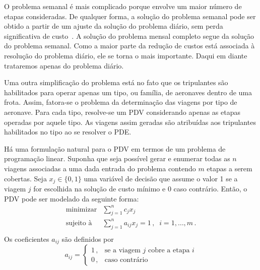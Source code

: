 \documentclass[12pt,a4paper]{article}
\newcommand{\ev}{\, ,}                                       %
\newcommand{\ep}{\, .}                                       %
\begin{document}
O problema semanal é mais complicado porque envolve um maior número de etapas consideradas. De
qualquer forma, a solução do problema semanal pode ser obtido a partir de um ajuste da solução do
problema diário, sem perda significativa de custo~\cite{gopalakrishnan05}. A solução do problema
mensal completo segue da solução do problema semanal. Como a maior parte da redução de custos está
associada à resolução do problema diário, ele se torna o mais importante. Daqui em diante trataremos
apenas do problema diário.

Uma outra simplificação do problema está no fato que os tripulantes são habilitados para operar
apenas um tipo, ou família, de aeronaves dentro de uma frota. Assim, fatora-se o problema da
determinação das viagens por tipo de aeronave. Para cada tipo, resolve-se um PDV considerando apenas
as etapas operadas por aquele tipo. As viagens assim geradas são atribuídas aos tripulantes
habilitados no tipo ao se resolver o PDE.

Há uma formulação natural para o PDV em termos de um problema de programação linear. Suponha que
seja possível gerar e enumerar todas as $n$ viagens associadas a uma dada entrada do problema
contendo $m$ etapas a serem cobertas. Seja $x_j \in \{0, 1\}$ uma variável de decisão que assume o
valor 1 se a viagem $j$ for escolhida na solução de custo mínimo e 0 caso contrário. Então, o PDV
pode ser modelado da seguinte forma:
%
\begin{equation} \label{eq:sppv}
	\begin{array}{rl}
		\text{minimizar} & \displaystyle \sum_{j=1}^n c_j x_j \\
		\text{sujeito à} & \displaystyle \sum_{j=1}^n a_{ij} x_j = 1 \, , \;\; i = 1, \ldots, m \ep \\
	\end{array}
\end{equation}
%
Os coeficientes $a_{ij}$ são definidos por
%
\begin{equation*}
	a_{ij} = \left\{
	\begin{array}{ll}
			1 \ev & \text{se a viagem $j$ cobre a etapa $i$} \\
			0 \ev & \text{caso contrário}
	\end{array}
	\right.
\end{equation*}
\end{document}
